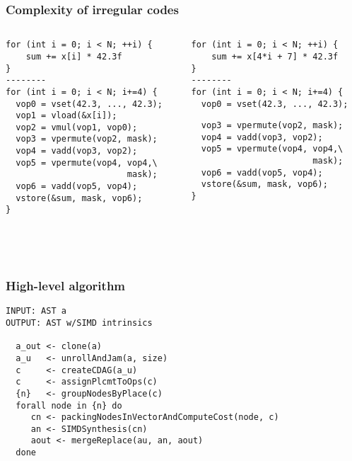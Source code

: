 \documentclass[xcolor=table,hideothersubsections,aspectratio=1610]{beamer}
\begin{document}
\begin{frame}[fragile]
    \frametitle{Complexity of irregular codes}
    \begin{columns}
        \small
        \begin{column}{0.45\textwidth}
            \begin{verbatim}
for (int i = 0; i < N; ++i) {
    sum += x[i] * 42.3f
}
--------
for (int i = 0; i < N; i+=4) {
  vop0 = vset(42.3, ..., 42.3);
  vop1 = vload(&x[i]);
  vop2 = vmul(vop1, vop0);
  vop3 = vpermute(vop2, mask);
  vop4 = vadd(vop3, vop2);
  vop5 = vpermute(vop4, vop4,\ 
                        mask);
  vop6 = vadd(vop5, vop4);
  vstore(&sum, mask, vop6);
}




\end{verbatim}
        \end{column}
        \begin{column}{0.45\textwidth}  %
            \begin{verbatim}
for (int i = 0; i < N; ++i) {
    sum += x[4*i + 7] * 42.3f
}
--------
for (int i = 0; i < N; i+=4) {
  vop0 = vset(42.3, ..., 42.3);\end{verbatim}
            {
            }
            \vspace{-.55cm}
            \begin{verbatim}
  vop3 = vpermute(vop2, mask);
  vop4 = vadd(vop3, vop2);
  vop5 = vpermute(vop4, vop4,\ 
                        mask);
  vop6 = vadd(vop5, vop4);
  vstore(&sum, mask, vop6);
}


\end{verbatim}

        \end{column}
    \end{columns}
\end{frame}

\begin{frame}[fragile]
    \frametitle{High-level algorithm}
    \begin{verbatim}
INPUT: AST a
OUTPUT: AST w/SIMD intrinsics

  a_out <- clone(a)
  a_u   <- unrollAndJam(a, size)
  c     <- createCDAG(a_u)
  c     <- assignPlcmtToOps(c)
  {n}   <- groupNodesByPlace(c)
  forall node in {n} do
     cn <- packingNodesInVectorAndComputeCost(node, c)
     an <- SIMDSynthesis(cn)
     aout <- mergeReplace(au, an, aout)
  done
\end{verbatim}

\end{frame}
\end{document}
